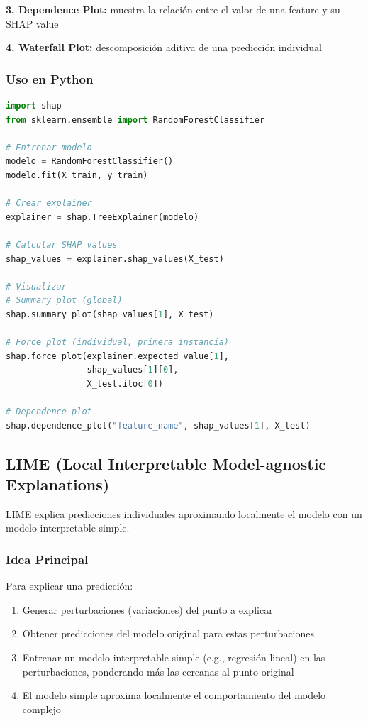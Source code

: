 \documentclass[11pt,a4paper]{article}
\begin{document}
\textbf{3. Dependence Plot:} muestra la relación entre el valor de una feature y su SHAP value

\textbf{4. Waterfall Plot:} descomposición aditiva de una predicción individual

\subsubsection{Uso en Python}

\begin{lstlisting}[language=Python]
import shap
from sklearn.ensemble import RandomForestClassifier

# Entrenar modelo
modelo = RandomForestClassifier()
modelo.fit(X_train, y_train)

# Crear explainer
explainer = shap.TreeExplainer(modelo)

# Calcular SHAP values
shap_values = explainer.shap_values(X_test)

# Visualizar
# Summary plot (global)
shap.summary_plot(shap_values[1], X_test)

# Force plot (individual, primera instancia)
shap.force_plot(explainer.expected_value[1], 
                shap_values[1][0], 
                X_test.iloc[0])

# Dependence plot
shap.dependence_plot("feature_name", shap_values[1], X_test)
\end{lstlisting}

\subsection{LIME (Local Interpretable Model-agnostic Explanations)}

LIME explica predicciones individuales aproximando localmente el modelo con un modelo interpretable simple.

\subsubsection{Idea Principal}

Para explicar una predicción:
\begin{enumerate}
\item Generar perturbaciones (variaciones) del punto a explicar
\item Obtener predicciones del modelo original para estas perturbaciones
\item Entrenar un modelo interpretable simple (e.g., regresión lineal) en las perturbaciones, ponderando más las cercanas al punto original
\item El modelo simple aproxima localmente el comportamiento del modelo complejo
\end{enumerate}
\end{document}
